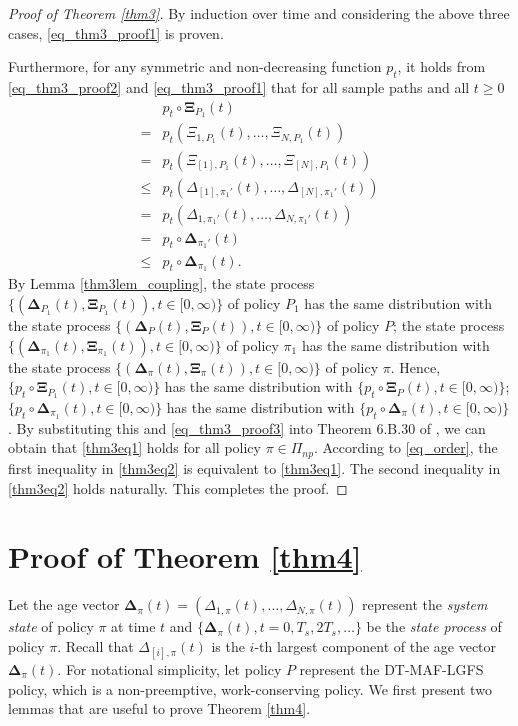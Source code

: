 \begin{proof}[Proof of Theorem \ref{thm3}]
By induction over time and considering the above three cases, \eqref{eq_thm3_proof1} is proven.

Furthermore, for any symmetric and non-decreasing   function $p_t$, it holds from \eqref{eq_thm3_proof2} and \eqref{eq_thm3_proof1} that for all sample paths and all $t\geq 0$
\begin{align}\label{eq_thm3_proof3}
&p_t\circ \bm \Xi_{P_1}(t) \nonumber\\
=& p_t(\Xi_{1,P_1} (t), \ldots, \Xi_{N,P_1} (t))\nonumber\\
=& p_t (\Xi_{[1],P_1} (t), \ldots, \Xi_{[N],P_1} (t))\nonumber\\
\leq & p_t (\Delta_{[1],\pi_1'} (t), \ldots, \Delta_{[N],\pi_1'} (t))\nonumber\\
=& p_t (\Delta_{1,\pi_1'} (t), \ldots, \Delta_{N,\pi_1'} (t))\nonumber\\
=& p_t\circ \bm \Delta_{\pi_1'}(t)\nonumber\\
\leq & p_t\circ \bm \Delta_{\pi_1}(t).
\end{align}
By Lemma \ref{thm3lem_coupling}, the state process $\{(\bm\Delta_{P_1}(t),\bm\Xi_{P_1}(t)),t\in [0,\infty)\}$ of policy $P_1$ has the same distribution with the state process $\{(\bm\Delta_{P}(t),\bm\Xi_{P}(t)),t\in [0,\infty)\}$ of policy $P$;
the state process $\{(\bm\Delta_{\pi_1}(t),\bm\Xi_{\pi_1}(t)),t\in [0,\infty)\}$ of policy $\pi_1$ has the same distribution with the state process $\{(\bm\Delta_{\pi}(t),\bm\Xi_{\pi}(t)),t\in [0,\infty)\}$  of policy $\pi$. Hence, $\{p_t\circ\bm\Xi_{P_1}(t),t\in [0,\infty)\}$ 
has the same distribution with $\{p_t\circ\bm\Xi_{P}(t),t\in [0,\infty)\}$; $\{p_t\circ\bm\Delta_{\pi_1}(t),t\in [0,\infty)\}$ 
has the same distribution with $\{p_t\circ\bm\Delta_{\pi}(t),t\in [0,\infty)\}$. By substituting this and \eqref{eq_thm3_proof3} into Theorem 6.B.30 of \cite{StochasticOrderBook}, we can obtain that \eqref{thm3eq1} holds for all policy $\pi\in\Pi_{np}$. According to  \eqref{eq_order}, the first inequality in \eqref{thm3eq2} is equivalent to   \eqref{thm3eq1}. The second inequality in \eqref{thm3eq2} holds naturally. This completes the proof.
\end{proof}

\section{Proof of Theorem \ref{thm4}}\label{app_thm4}


Let the age vector $\bm\Delta_{\pi}(t) = (\Delta_{1,\pi} (t),\ldots,\Delta_{N,\pi} (t))$ represent the \emph{system state} of policy $\pi$ at time $t$ and $\{\bm\Delta_{\pi}(t),t=0,T_s,2T_s,\ldots\}$ be the \emph{state process} of policy $\pi$. Recall that $\Delta_{[i],\pi}(t)$ is the $i$-th largest component of the age vector $\bm\Delta_{\pi}(t)$. For notational simplicity, let policy $P$ represent the DT-MAF-LGFS policy, which is a non-preemptive, work-conserving policy. We first present two lemmas that are useful to prove Theorem \ref{thm4}. 



